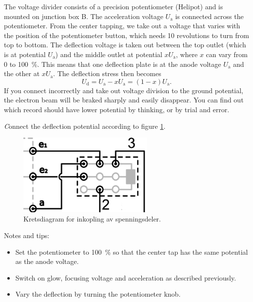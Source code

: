 \documentclass[../Elmag-labhefte-2020.tex]{subfiles}
\begin{document}
The voltage divider consists of a precision potentiometer (Helipot) and is mounted on junction box B. The acceleration voltage $U_\mathrm{a}$ is connected across the potentiometer. From the center tapping, we take out a voltage that varies with the position of the potentiometer button, which needs 10 revolutions to turn from top to bottom. The deflection voltage is taken out between the top outlet (which is at potential $U_\mathrm{a}$) and the middle outlet at potential $x  U_\mathrm{a}$, where $x$ can vary from 0 to \SI{100}{\percent}. This means that one deflection plate is at the anode voltage $U_\mathrm{a}$ and the other at $x  U_\mathrm{a}$. The deflection stress then becomes
\begin{equation}
    U_\mathrm{d} 
        = U_\mathrm{a} - x U_\mathrm{a} 
        = (1 - x) U_\mathrm{a}.
\end{equation}
If you connect incorrectly and take out voltage division to the ground potential, the electron beam will be braked sharply and easily disappear. You can find out which record should have lower potential by thinking, or by trial and error.

{\emph Connect the deflection potential according to figure \ref{fig:spenningsdeler}.}
 
\begin{figure}[!ht]
\RawFloats
    \begin{center}
    \includegraphics[width=0.6\textwidth]{fig/spenningsdeler-new.pdf}
    \caption{%
        Kretsdiagram for inkopling av spenningsdeler.
    }
    \label{fig:spenningsdeler}
    \end{center}
\end{figure}

Notes and tips:
\vspace{-4mm}
\begin{itemize}
    \item Set the potentiometer to \SI{100}{\percent} so that the center tap has the same potential as the anode voltage.
    \item Switch on glow, focusing voltage and acceleration as described previously.
    \item Vary the deflection by turning the potentiometer knob.
\end{itemize}
\end{document}
